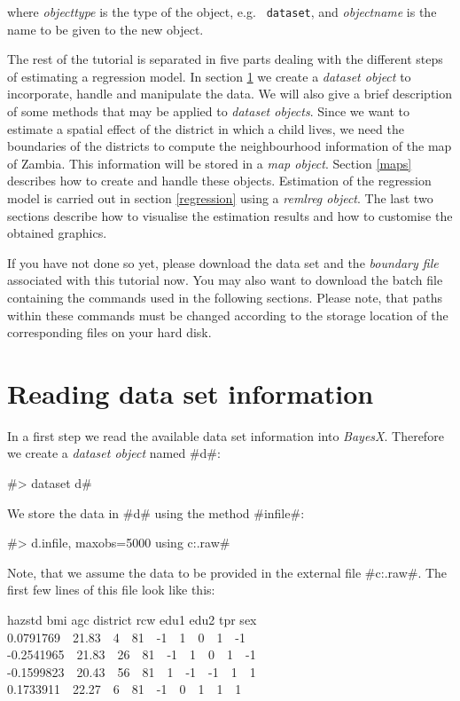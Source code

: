 \documentclass{article}
\begin{document}
where {\em objecttype} is the type of the object, e.g. {\tt
dataset}, and {\em objectname} is the name to be given to the new
object.

The rest of the tutorial is separated in five parts dealing with
the different steps of estimating a regression model. In section
\ref{datasets} we create a {\em dataset object} to incorporate,
handle and manipulate the data. We will also give a brief
description of some methods that may be applied to {\em dataset
objects}. Since we want to estimate a spatial effect of the
district in which a child lives, we need the boundaries of the
districts to compute the neighbourhood information of the map of
Zambia. This information will be stored in a {\em map object}.
Section \ref{maps} describes how to create and handle these
objects. Estimation of the regression model is carried out in
section \ref{regression} using a {\em remlreg object}. The last
two sections describe how to visualise the estimation results and
how to customise the obtained graphics.

If you have not done so yet, please download the data set and the
{\it boundary file} associated with this tutorial now. You may
also want to download the batch file containing the commands used
in the following sections. Please note, that paths within these
commands must be changed according to the storage location of the
corresponding files on your hard disk.

\section{Reading data set information}\label{datasets}

In a first step we read the available data set information into
{\it BayesX}. Therefore we create a {\it dataset object} named
#d#:

#> dataset d#

We store the data in #d# using the method #infile#:

#> d.infile, maxobs=5000 using c:\data\zambia.raw#

Note, that we assume the data to be provided in the external file
#c:\data\zambia.raw#. The first few lines of this file look like
this:

{\footnotesize
 hazstd bmi agc district rcw edu1 edu2 tpr sex\\
 0.0791769 \,\, 21.83 \,\, 4 \,\, 81 \,\, -1 \,\, 1 \,\, 0 \,\, 1 \,\, -1\\
 -0.2541965 \,\, 21.83 \,\, 26 \,\, 81 \,\, -1 \,\, 1 \,\, 0 \,\, 1 \,\, -1\\
 -0.1599823 \,\, 20.43 \,\, 56 \,\, 81 \,\, 1 \,\, -1 \,\, -1 \,\, 1 \,\, 1\\
 0.1733911 \,\, 22.27 \,\, 6 \,\, 81 \,\, -1 \,\, 0 \,\, 1 \,\, 1 \,\, 1}
\end{document}
